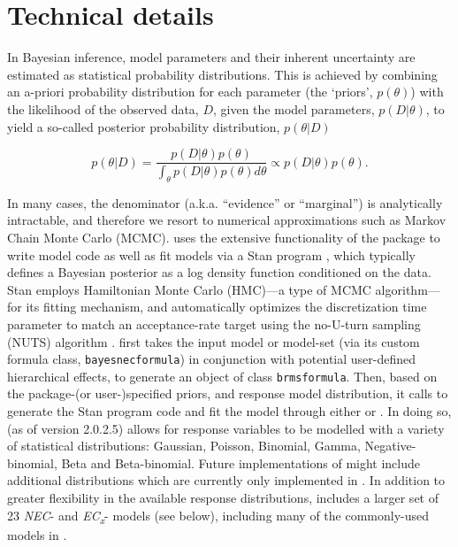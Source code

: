 \documentclass[
  shortnames]{jss}
\begin{document}
\hypertarget{technical-details}{%
\section{Technical details}\label{technical-details}}

In Bayesian inference, model parameters and their inherent uncertainty are estimated as statistical probability distributions. This is achieved by combining an a-priori probability distribution for each parameter (the `priors', \(p(\theta)\)) with the likelihood of the observed data, \(D\), given the model parameters, \(p(D | \theta)\), to yield a so-called posterior probability distribution, \(p(\theta | D)\)

\begin{equation}
  p(\theta | D) = \frac{p(D | \theta) p(\theta)}{\int_{\theta} p(D | \theta) p(\theta) d \theta} \propto p(D | \theta) p(\theta).
  \label{eqn1}
\end{equation}

In many cases, the denominator (a.k.a. ``evidence'' or ``marginal'') is analytically intractable, and therefore we resort to numerical approximations such as Markov Chain Monte Carlo (MCMC).  uses the extensive functionality of the  package to write model code as well as fit models via a Stan program \citep{stan2021}, which typically defines a Bayesian posterior as a log density function conditioned on the data. Stan employs Hamiltonian Monte Carlo (HMC)---a type of MCMC algorithm---for its fitting mechanism, and automatically optimizes the discretization time parameter to match an acceptance-rate target using the no-U-turn sampling (NUTS) algorithm \citep{hoffman2014}.  first takes the input model or model-set (via its custom formula class, \texttt{bayesnecformula}) in conjunction with potential user-defined hierarchical effects, to generate an object of class \texttt{brmsformula}. Then, based on the package-(or user-)specified priors, and response model distribution, it calls  \citep{Burkner2017, Burkner2018} to generate the Stan program code and fit the model through either  \citep{rstan2021} or \citep{cmdstanr2022}. In doing so,  (as of version 2.0.2.5) allows for response variables to be modelled with a variety of statistical distributions: Gaussian, Poisson, Binomial, Gamma, Negative-binomial, Beta and Beta-binomial. Future implementations of  might include additional distributions which are currently only implemented in . In addition to greater flexibility in the available response distributions,  includes a larger set of 23 \emph{NEC}- and \emph{EC\textsubscript{x}}- models (see below), including many of the commonly-used models in  \citep{Ritz2016}.
\end{document}
